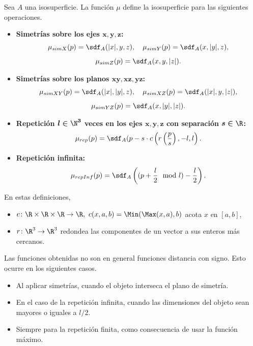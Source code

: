 \begin{definicion}\label{d:posicionamiento}
    Sea $A$ una isosuperficie. La función $\mu$ define la isosuperficie para las siguientes operaciones.
    \begin{itemize}
        \item \textbf{Simetrías sobre los ejes $\boldsymbol{x,y,z}$:}
        \begin{gather*}
            \mu_{simX}(p) = \sdf_{A}(\vert x\vert, y, z),\quad \mu_{simY}(p) = \sdf_{A}(x, \vert y\vert,  z),\\[5pt] \mu_{simZ}(p) = \sdf_{A}(x,y,\vert z\vert).
        \end{gather*}
        \item \textbf{Simetrías sobre los planos $\boldsymbol{xy,xz,yz}$:}
        \begin{gather*}
            \mu_{simXY}(p) = \sdf_{A}(\vert x\vert, \vert y\vert, z),\quad \mu_{simXZ}(p) = \sdf_{A}(\vert x\vert, y,  \vert z\vert),\\[5pt]\mu_{simYZ}(p) = \sdf_{A}(x,\vert y\vert ,\vert z\vert).
        \end{gather*}
        \item \textbf{Repetición $\boldsymbol{l\in \N^3}$ veces en los ejes $\boldsymbol{x,y,z}$ con separación $\boldsymbol{s\in\R}$:} 
        \begin{equation*}
            \mu_{rep}(p) = \sdf_{A}(p - s\cdot c\left(r\left(\frac{p}{s}\right), -l, l\right).
        \end{equation*}
        \item \textbf{Repetición infinita:}
        \begin{equation*}
            \mu_{repInf}(p) = \sdf_{A}\left((p+\frac{l}{2}\mod l )- \frac{l}{2}\right).
        \end{equation*}
    \end{itemize}
    En estas definiciones,
    \begin{itemize}
        \item $c\colon \R\times\R\times\R\to \R,\ c(x,a,b) = \Min(\Max(x, a), b)$ acota $x$ en $[a,b]$,
        \item $r\colon \R^3 \to \R^3$ redondea las componentes de un vector a sus enteros más cercanos.
    \end{itemize}
\end{definicion}


Las funciones obtenidas no son en general funciones distancia con signo. Esto ocurre en los siguientes casos.
\begin{itemize}
    \item Al aplicar simetrías, cuando el objeto interseca el plano de simetría.
    \item En el caso de la repetición infinita, cuando las dimensiones del objeto sean mayores o iguales a $l/2$.
    \item Siempre para la repetición finita, como consecuencia de usar la función máximo. 
\end{itemize}

